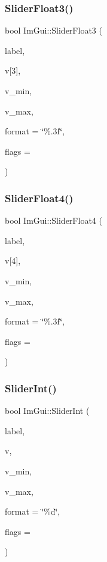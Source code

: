 \subsubsection{\texorpdfstring{Slider\+Float3()}{SliderFloat3()}}
{\footnotesize\ttfamily bool Im\+Gui\+::\+Slider\+Float3 (\begin{DoxyParamCaption}\item[{const char $\ast$}]{label,  }\item[{float}]{v\mbox{[}3\mbox{]},  }\item[{float}]{v\+\_\+min,  }\item[{float}]{v\+\_\+max,  }\item[{const char $\ast$}]{format = {\ttfamily \char`\"{}\%.3f\char`\"{}},  }\item[{Im\+Gui\+Slider\+Flags}]{flags = {} }\end{DoxyParamCaption})}

\mbox{\label{namespaceImGui_acee94c7b89963d8fec32de541cd7205f}} 
\subsubsection{\texorpdfstring{Slider\+Float4()}{SliderFloat4()}}
{\footnotesize\ttfamily bool Im\+Gui\+::\+Slider\+Float4 (\begin{DoxyParamCaption}\item[{const char $\ast$}]{label,  }\item[{float}]{v\mbox{[}4\mbox{]},  }\item[{float}]{v\+\_\+min,  }\item[{float}]{v\+\_\+max,  }\item[{const char $\ast$}]{format = {\ttfamily \char`\"{}\%.3f\char`\"{}},  }\item[{Im\+Gui\+Slider\+Flags}]{flags = {} }\end{DoxyParamCaption})}

\mbox{\label{namespaceImGui_a580128c9b35d1a9fc5b7a057f6f5464a}} 
\subsubsection{\texorpdfstring{Slider\+Int()}{SliderInt()}}
{\footnotesize\ttfamily bool Im\+Gui\+::\+Slider\+Int (\begin{DoxyParamCaption}\item[{const char $\ast$}]{label,  }\item[{int $\ast$}]{v,  }\item[{int}]{v\+\_\+min,  }\item[{int}]{v\+\_\+max,  }\item[{const char $\ast$}]{format = {\ttfamily \char`\"{}\%d\char`\"{}},  }\item[{Im\+Gui\+Slider\+Flags}]{flags = {} }\end{DoxyParamCaption})}

